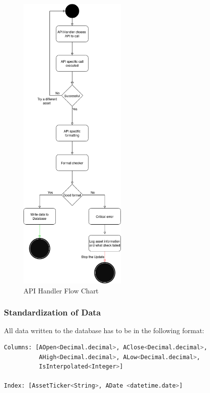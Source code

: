 \documentclass[main.tex]{subfiles}
\begin{document}
\begin{figure}[H]
    \centering
    \includegraphics[width=0.47\textwidth]{04Design/04Pictures/api_handler_v3.png}
    \caption{API Handler Flow Chart \cite{TR}}
\end{figure}

\subsubsection{Standardization of Data}
All data written to the database has to be in the following format:

\begin{lstlisting}[language=Python, caption= Pandas Data Frame Format]
Columns: [AOpen<Decimal.decimal>, AClose<Decimal.decimal>,
          AHigh<Decimal.decimal>, ALow<Decimal.decimal>,
          IsInterpolated<Integer>] 
          
Index: [AssetTicker<String>, ADate <datetime.date>]
\end{lstlisting}
\end{document}
